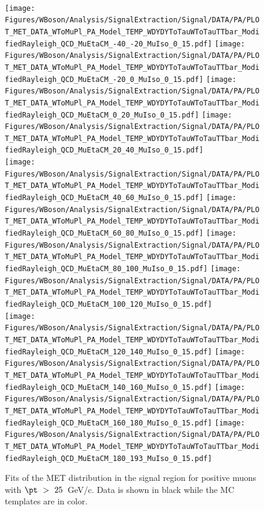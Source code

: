 \begin{figure}[!h]
\begin{center}
\begin{tiny}
\\
\texttt{[image: Figures/WBoson/Analysis/SignalExtraction/Signal/DATA/PA/PLOT\_MET\_DATA\_WToMuPl\_PA\_Model\_TEMP\_WDYDYToTauWToTauTTbar\_ModifiedRayleigh\_QCD\_MuEtaCM\_-40\_-20\_MuIso\_0\_15.pdf]}
\texttt{[image: Figures/WBoson/Analysis/SignalExtraction/Signal/DATA/PA/PLOT\_MET\_DATA\_WToMuPl\_PA\_Model\_TEMP\_WDYDYToTauWToTauTTbar\_ModifiedRayleigh\_QCD\_MuEtaCM\_-20\_0\_MuIso\_0\_15.pdf]}
\texttt{[image: Figures/WBoson/Analysis/SignalExtraction/Signal/DATA/PA/PLOT\_MET\_DATA\_WToMuPl\_PA\_Model\_TEMP\_WDYDYToTauWToTauTTbar\_ModifiedRayleigh\_QCD\_MuEtaCM\_0\_20\_MuIso\_0\_15.pdf]}
\texttt{[image: Figures/WBoson/Analysis/SignalExtraction/Signal/DATA/PA/PLOT\_MET\_DATA\_WToMuPl\_PA\_Model\_TEMP\_WDYDYToTauWToTauTTbar\_ModifiedRayleigh\_QCD\_MuEtaCM\_20\_40\_MuIso\_0\_15.pdf]}
\\
\texttt{[image: Figures/WBoson/Analysis/SignalExtraction/Signal/DATA/PA/PLOT\_MET\_DATA\_WToMuPl\_PA\_Model\_TEMP\_WDYDYToTauWToTauTTbar\_ModifiedRayleigh\_QCD\_MuEtaCM\_40\_60\_MuIso\_0\_15.pdf]}
\texttt{[image: Figures/WBoson/Analysis/SignalExtraction/Signal/DATA/PA/PLOT\_MET\_DATA\_WToMuPl\_PA\_Model\_TEMP\_WDYDYToTauWToTauTTbar\_ModifiedRayleigh\_QCD\_MuEtaCM\_60\_80\_MuIso\_0\_15.pdf]}
\texttt{[image: Figures/WBoson/Analysis/SignalExtraction/Signal/DATA/PA/PLOT\_MET\_DATA\_WToMuPl\_PA\_Model\_TEMP\_WDYDYToTauWToTauTTbar\_ModifiedRayleigh\_QCD\_MuEtaCM\_80\_100\_MuIso\_0\_15.pdf]}
\texttt{[image: Figures/WBoson/Analysis/SignalExtraction/Signal/DATA/PA/PLOT\_MET\_DATA\_WToMuPl\_PA\_Model\_TEMP\_WDYDYToTauWToTauTTbar\_ModifiedRayleigh\_QCD\_MuEtaCM\_100\_120\_MuIso\_0\_15.pdf]}
\\
\texttt{[image: Figures/WBoson/Analysis/SignalExtraction/Signal/DATA/PA/PLOT\_MET\_DATA\_WToMuPl\_PA\_Model\_TEMP\_WDYDYToTauWToTauTTbar\_ModifiedRayleigh\_QCD\_MuEtaCM\_120\_140\_MuIso\_0\_15.pdf]}
\texttt{[image: Figures/WBoson/Analysis/SignalExtraction/Signal/DATA/PA/PLOT\_MET\_DATA\_WToMuPl\_PA\_Model\_TEMP\_WDYDYToTauWToTauTTbar\_ModifiedRayleigh\_QCD\_MuEtaCM\_140\_160\_MuIso\_0\_15.pdf]}
\texttt{[image: Figures/WBoson/Analysis/SignalExtraction/Signal/DATA/PA/PLOT\_MET\_DATA\_WToMuPl\_PA\_Model\_TEMP\_WDYDYToTauWToTauTTbar\_ModifiedRayleigh\_QCD\_MuEtaCM\_160\_180\_MuIso\_0\_15.pdf]}
\texttt{[image: Figures/WBoson/Analysis/SignalExtraction/Signal/DATA/PA/PLOT\_MET\_DATA\_WToMuPl\_PA\_Model\_TEMP\_WDYDYToTauWToTauTTbar\_ModifiedRayleigh\_QCD\_MuEtaCM\_180\_193\_MuIso\_0\_15.pdf]}
\end{tiny}
\caption{Fits of the MET distribution in the signal region for positive muons with $\pt~>~25$~GeV/c. Data is shown in black while the MC templates are in color.}
\label{fig:METFits_WToMuPl_PA}
\end{center}
\end{figure}

